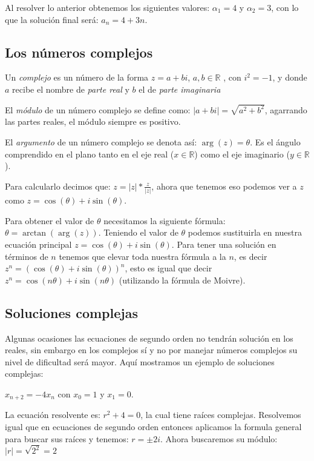 \documentclass{article}
\begin{document}
Al resolver lo anterior obtenemos los siguientes valores:
$\alpha_{1}=4$ y $\alpha_{2}=3$, con lo que la solución final será:
$a_{n}=4+3n$.


\subsection{Los números  complejos}

Un \textit{complejo} es un número de la forma $z=a+bi$, $a,b\in\mathbb{R}$ ,
con $i^2=-1$, y donde $a$ recibe el nombre de \textit{parte real} y $b$ el de
\textit{parte imaginaria}

El \textit{módulo} de un número complejo se define como:
$|a+bi|=\sqrt{a^2+b^2}$, agarrando las partes reales, el módulo
siempre es positivo.

El \textit{argumento} de un número complejo se denota así: $\arg(z)=\theta$. Es
el ángulo comprendido en el plano tanto en el eje real
($x\in\mathbb{R}$) como el eje imaginario ($y\in\mathbb{R}$).

Para calcularlo decimos que:
$z=|z|*\frac{z}{|z|}$, ahora que tenemos eso podemos ver a $z$ como
$z=\cos(\theta)+i\sin(\theta)$.

Para obtener el valor de $\theta$
necesitamos la siguiente fórmula: $\theta=\arctan(\arg(z))$. Teniendo el
valor de $\theta$ podemos sustituirla en nuestra ecuación principal
$z=\cos(\theta)+i\sin(\theta)$. Para tener una solución en términos de
$n$ tenemos que elevar toda nuestra fórmula a la $n$, es decir
$z^n=(\cos(\theta)+i\sin(\theta))^n$, esto es igual que decir
$z^n=\cos(n\theta)+i\sin(n\theta)$ (utilizando la fórmula de Moivre).

\subsection{Soluciones complejas}
\label{sec:complejas}

Algunas ocasiones las ecuaciones de segundo orden no tendrán solución
en los reales, sin embargo en los complejos sí y no por manejar
números complejos su nivel de dificultad será mayor. Aquí mostramos un
ejemplo de soluciones complejas: 

$x_{n+2}=-4x_{n}$ con $x_0=1$ y $x_1=0$.

La ecuación resolvente es: $r^2+4=0$, la cual tiene raíces complejas.
Resolvemos igual que en ecuaciones de segundo orden entonces aplicamos
la formula general para buscar sus raíces y tenemos: $r=\pm2i$.
Ahora buscaremos su módulo: $|r|=\sqrt{2^2}=2$
\end{document}
